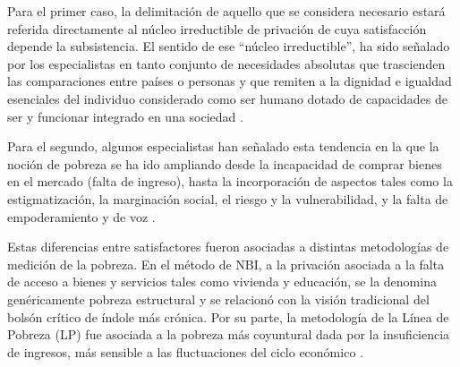 Para el primer caso, la delimitación de aquello que se considera necesario estará referida directamente al núcleo irreductible de privación de cuya satisfacción depende la subsistencia. El sentido de ese “núcleo irreductible”, ha sido señalado por los especialistas en tanto conjunto de necesidades absolutas que trascienden las comparaciones entre países o personas y que remiten a la dignidad e igualdad esenciales del individuo considerado como ser humano dotado de capacidades de ser y funcionar integrado en una sociedad \cite{altimir1979,sen}.

Para el segundo, algunos especialistas han señalado esta tendencia en la que la noción de pobreza se ha ido ampliando desde la incapacidad de comprar bienes en el mercado (falta de ingreso), hasta la incorporación de aspectos tales como la estigmatización, la marginación social, el riesgo y la vulnerabilidad, y la falta de empoderamiento y de voz \cite{kanbur}.

Estas diferencias entre satisfactores fueron asociadas a distintas metodologías de medición de la pobreza. En el método de NBI, a la privación asociada a la falta de acceso a bienes y servicios tales como vivienda y educación, se la denomina genéricamente pobreza estructural y se relacionó con la visión tradicional del bolsón crítico de índole más crónica. Por su parte, la metodología de la Línea de Pobreza (LP) fue asociada a la pobreza más coyuntural dada por la insuficiencia de ingresos, más sensible a las fluctuaciones del ciclo económico \cite{katzman,boltvinik1990}. 

